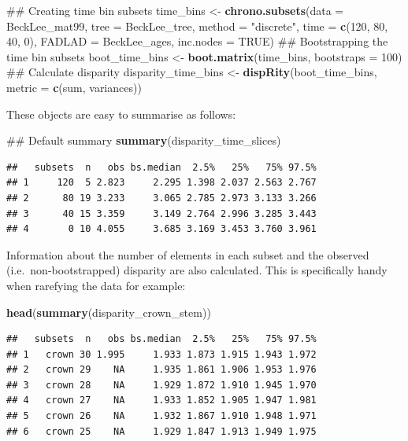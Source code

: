 \documentclass[]{book}
\newenvironment{Shaded}{\begin{snugshade}}{\end{snugshade}}
\newcommand{\KeywordTok}[1]{\textcolor[rgb]{0.13,0.29,0.53}{\textbf{#1}}}
\newcommand{\DataTypeTok}[1]{\textcolor[rgb]{0.13,0.29,0.53}{#1}}
\newcommand{\DecValTok}[1]{\textcolor[rgb]{0.00,0.00,0.81}{#1}}
\newcommand{\StringTok}[1]{\textcolor[rgb]{0.31,0.60,0.02}{#1}}
\newcommand{\OtherTok}[1]{\textcolor[rgb]{0.56,0.35,0.01}{#1}}
\newcommand{\NormalTok}[1]{#1}
\theoremstyle{definition}
\theoremstyle{definition}
\theoremstyle{definition}
\theoremstyle{remark}
\begin{document}
\begin{Shaded}
\begin{Highlighting}[]
\NormalTok{## Creating time bin subsets}
\NormalTok{time_bins <-}\StringTok{ }\KeywordTok{chrono.subsets}\NormalTok{(}\DataTypeTok{data =}\NormalTok{ BeckLee_mat99, }\DataTypeTok{tree =}\NormalTok{ BeckLee_tree, }
    \DataTypeTok{method =} \StringTok{"discrete"}\NormalTok{, }\DataTypeTok{time =} \KeywordTok{c}\NormalTok{(}\DecValTok{120}\NormalTok{, }\DecValTok{80}\NormalTok{, }\DecValTok{40}\NormalTok{, }\DecValTok{0}\NormalTok{), }\DataTypeTok{FADLAD =}\NormalTok{ BeckLee_ages,}
    \DataTypeTok{inc.nodes =} \OtherTok{TRUE}\NormalTok{)}
\NormalTok{## Bootstrapping the time bin subsets}
\NormalTok{boot_time_bins <-}\StringTok{ }\KeywordTok{boot.matrix}\NormalTok{(time_bins, }\DataTypeTok{bootstraps =} \DecValTok{100}\NormalTok{)}
\NormalTok{## Calculate disparity}
\NormalTok{disparity_time_bins <-}\StringTok{ }\KeywordTok{dispRity}\NormalTok{(boot_time_bins, }\DataTypeTok{metric =} \KeywordTok{c}\NormalTok{(sum, variances))}
\end{Highlighting}
\end{Shaded}

These objects are easy to summarise as follows:

\begin{Shaded}
\begin{Highlighting}[]
\NormalTok{## Default summary}
\KeywordTok{summary}\NormalTok{(disparity_time_slices)}
\end{Highlighting}
\end{Shaded}

\begin{verbatim}
##   subsets  n   obs bs.median  2.5%   25%   75% 97.5%
## 1     120  5 2.823     2.295 1.398 2.037 2.563 2.767
## 2      80 19 3.233     3.065 2.785 2.973 3.133 3.266
## 3      40 15 3.359     3.149 2.764 2.996 3.285 3.443
## 4       0 10 4.055     3.685 3.169 3.453 3.760 3.961
\end{verbatim}

Information about the number of elements in each subset and the observed
(i.e.~non-bootstrapped) disparity are also calculated. This is
specifically handy when rarefying the data for example:

\begin{Shaded}
\begin{Highlighting}[]
\KeywordTok{head}\NormalTok{(}\KeywordTok{summary}\NormalTok{(disparity_crown_stem))}
\end{Highlighting}
\end{Shaded}

\begin{verbatim}
##   subsets  n   obs bs.median  2.5%   25%   75% 97.5%
## 1   crown 30 1.995     1.933 1.873 1.915 1.943 1.972
## 2   crown 29    NA     1.935 1.861 1.906 1.953 1.976
## 3   crown 28    NA     1.929 1.872 1.910 1.945 1.970
## 4   crown 27    NA     1.933 1.852 1.905 1.947 1.981
## 5   crown 26    NA     1.932 1.867 1.910 1.948 1.971
## 6   crown 25    NA     1.929 1.847 1.913 1.949 1.975
\end{verbatim}
\end{document}
